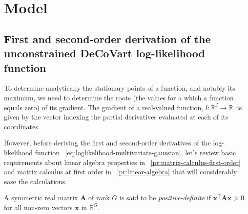 \documentclass[long, final]{jobim}
\newcommand \RR {\mathbb{R}}
\begin{document}
 


 \appendix

\section{Model}


\subsection{First and second-order derivation of the unconstrained DeCoVart log-likelihood function}
\label{subsubsec:uncontrained-optimisation}

To determine analytically the stationary points of a function, and notably its maximum, we need to determine the roots (the values for a which a function equals zero) of its gradient.  The gradient of a real-valued function, $l:\RR^J \to \RR$, is given by the vector indexing the partial derivatives evaluated at each of its coordinates.

However, before deriving the first and second-order derivatives of the log-likelihood function \equationname~\ref{eq:loglikelihood-multivariate-gaussian}, let's review basic requirements about linear algebra properties in \propertyname~\ref{pr:matrix-calculus-first-order} and matrix calculus at first order in \propertyname~\ref{pr:linear-algebra} that will considerably ease the calculations.

\begin{definition}
\label{def:positive-definite}
A symmetric real matrix $\boldsymbol{A}$ of rank $G$ is said to be \textit{positive-definite} if $\boldsymbol{x}^\top \boldsymbol{A} \boldsymbol{x} > 0$ for all non-zero vectors $\boldsymbol{x}$ in $\mathbb{R}^G$.
\end{definition}
\end{document}
